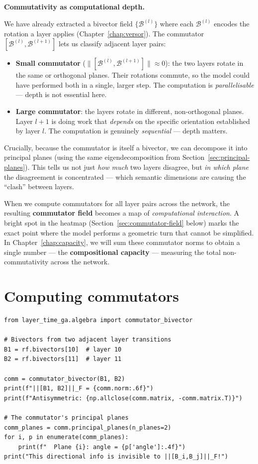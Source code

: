 \documentclass[11pt, twoside, openright]{memoir}
\newcommand{\bivec}[1]{\mathcal{B}^{(#1)}}  %
\numberwithin{equation}{chapter}
\begin{document}
\begin{keyidea}
\textbf{Commutativity as computational depth.}

We have already extracted a bivector field $\{\bivec{l}\}$ where each
$\bivec{l}$ encodes the rotation a layer applies
(Chapter~\ref{chap:versor}).  The commutator $[\bivec{l},
\bivec{l+1}]$ lets us classify adjacent layer pairs:

\begin{itemize}[nosep]
\item \textbf{Small commutator} ($\|[\bivec{l}, \bivec{l+1}]\|
  \approx 0$): the two layers rotate in the same or orthogonal planes.
  Their rotations commute, so the model could have performed both in a
  single, larger step.  The computation is \emph{parallelisable} ---
  depth is not essential here.
\item \textbf{Large commutator}: the layers rotate in different,
  non-orthogonal planes.  Layer $l+1$ is doing work that
  \emph{depends} on the specific orientation established by layer $l$.
  The computation is genuinely \emph{sequential} --- depth matters.
\end{itemize}

Crucially, because the commutator is itself a bivector, we can
decompose it into principal planes (using the same eigendecomposition
from Section~\ref{sec:principal-planes}).  This tells us not just
\emph{how much} two layers disagree, but \emph{in which plane} the
disagreement is concentrated --- which semantic dimensions are causing
the ``clash'' between layers.
\end{keyidea}

When we compute commutators for all layer pairs across the network,
the resulting \textbf{commutator field} becomes a map of
\emph{computational interaction}.  A bright spot in the heatmap
(Section~\ref{sec:commutator-field} below) marks the exact point
where the model performs a geometric turn that cannot be simplified.
In Chapter~\ref{chap:capacity}, we will sum these commutator norms
to obtain a single number --- the \textbf{compositional capacity} ---
measuring the total non-commutativity across the network.

\section{Computing commutators}

\begin{lstlisting}[caption={Commutator of two bivectors}]
from layer_time_ga.algebra import commutator_bivector

# Bivectors from two adjacent layer transitions
B1 = rf.bivectors[10]  # layer 10
B2 = rf.bivectors[11]  # layer 11

comm = commutator_bivector(B1, B2)
print(f"||[B1, B2]||_F = {comm.norm:.6f}")
print(f"Antisymmetric: {np.allclose(comm.matrix, -comm.matrix.T)}")

# The commutator's principal planes
comm_planes = comm.principal_planes(n_planes=2)
for i, p in enumerate(comm_planes):
    print(f"  Plane {i}: angle = {p['angle']:.4f}")
print("This directional info is invisible to ||[B_i,B_j]||_F!")
\end{lstlisting}
\end{document}
